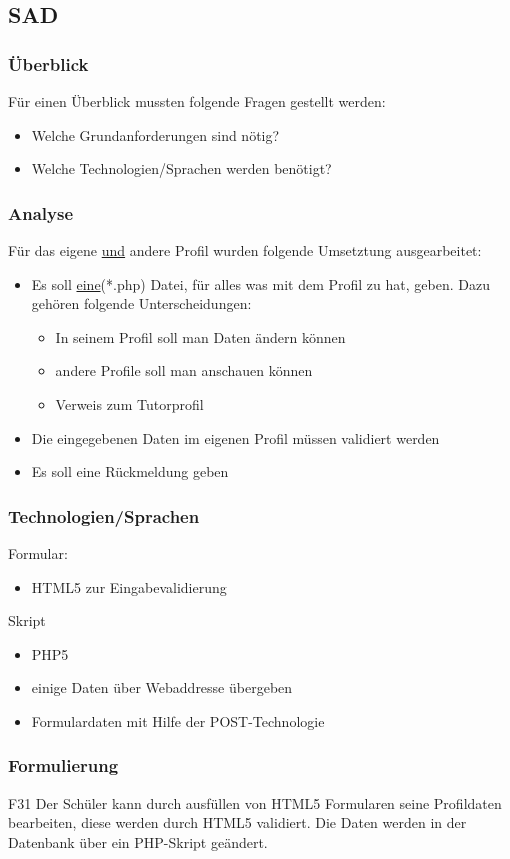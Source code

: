 \subsection{SAD}
\begin{frame}
\frametitle{Überblick}
 Für einen Überblick mussten folgende Fragen gestellt werden:
 \begin{itemize}
  \item Welche Grundanforderungen sind nötig?
  \item Welche Technologien/Sprachen werden benötigt?
 \end{itemize}
\end{frame}
\begin{frame}
 \frametitle{Analyse}
 Für das eigene \underline{und} andere Profil wurden folgende Umsetztung ausgearbeitet:
 \begin{itemize}
  \item Es soll \underline{eine}(*.php) Datei, für alles was mit dem Profil zu hat, geben. Dazu gehören folgende Unterscheidungen:
    \begin{itemize}
     \item In seinem Profil soll man Daten ändern können
     \item andere Profile soll man anschauen können
     \item Verweis zum Tutorprofil
    \end{itemize}
  \item Die eingegebenen Daten im eigenen Profil müssen validiert werden
  \item Es soll eine Rückmeldung geben
 \end{itemize}
\end{frame}
\begin{frame}
 \frametitle{Technologien/Sprachen}
 Formular:
 \begin{itemize}
  \item HTML5 zur Eingabevalidierung
 \end{itemize}
 Skript
 \begin{itemize}
  \item PHP5
  \item einige Daten über Webaddresse übergeben
  \item Formulardaten mit Hilfe der POST-Technologie
 \end{itemize}
\end{frame}
\begin{frame}
 \frametitle{Formulierung}
  \begin{block}{F31}
   Der Schüler kann durch ausfüllen von HTML5 Formularen seine Profildaten bearbeiten, diese werden durch HTML5 validiert. Die Daten werden in der Datenbank über ein PHP-Skript geändert.
  \end{block}
\end{frame}

